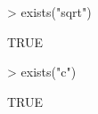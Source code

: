 \begin{Schunk}
\begin{Sinput}
> exists("sqrt")
\end{Sinput}
\begin{Soutput}
[1] TRUE
\end{Soutput}
\begin{Sinput}
> exists("c")
\end{Sinput}
\begin{Soutput}
[1] TRUE
\end{Soutput}
\end{Schunk}
